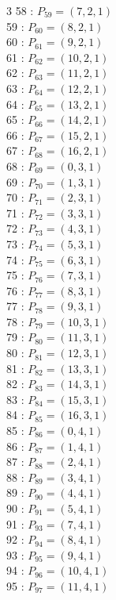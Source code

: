 \documentclass{article}
\begin{document}
{\begin{multicols}{3}
58 : $P_{59}=( 7, 2, 1 )$\\
59 : $P_{60}=( 8, 2, 1 )$\\
60 : $P_{61}=( 9, 2, 1 )$\\
61 : $P_{62}=( 10, 2, 1 )$\\
62 : $P_{63}=( 11, 2, 1 )$\\
63 : $P_{64}=( 12, 2, 1 )$\\
64 : $P_{65}=( 13, 2, 1 )$\\
65 : $P_{66}=( 14, 2, 1 )$\\
66 : $P_{67}=( 15, 2, 1 )$\\
67 : $P_{68}=( 16, 2, 1 )$\\
68 : $P_{69}=( 0, 3, 1 )$\\
69 : $P_{70}=( 1, 3, 1 )$\\
70 : $P_{71}=( 2, 3, 1 )$\\
71 : $P_{72}=( 3, 3, 1 )$\\
72 : $P_{73}=( 4, 3, 1 )$\\
73 : $P_{74}=( 5, 3, 1 )$\\
74 : $P_{75}=( 6, 3, 1 )$\\
75 : $P_{76}=( 7, 3, 1 )$\\
76 : $P_{77}=( 8, 3, 1 )$\\
77 : $P_{78}=( 9, 3, 1 )$\\
78 : $P_{79}=( 10, 3, 1 )$\\
79 : $P_{80}=( 11, 3, 1 )$\\
80 : $P_{81}=( 12, 3, 1 )$\\
81 : $P_{82}=( 13, 3, 1 )$\\
82 : $P_{83}=( 14, 3, 1 )$\\
83 : $P_{84}=( 15, 3, 1 )$\\
84 : $P_{85}=( 16, 3, 1 )$\\
85 : $P_{86}=( 0, 4, 1 )$\\
86 : $P_{87}=( 1, 4, 1 )$\\
87 : $P_{88}=( 2, 4, 1 )$\\
88 : $P_{89}=( 3, 4, 1 )$\\
89 : $P_{90}=( 4, 4, 1 )$\\
90 : $P_{91}=( 5, 4, 1 )$\\
91 : $P_{93}=( 7, 4, 1 )$\\
92 : $P_{94}=( 8, 4, 1 )$\\
93 : $P_{95}=( 9, 4, 1 )$\\
94 : $P_{96}=( 10, 4, 1 )$\\
95 : $P_{97}=( 11, 4, 1 )$\\

\end{multicols}}
\end{document}
